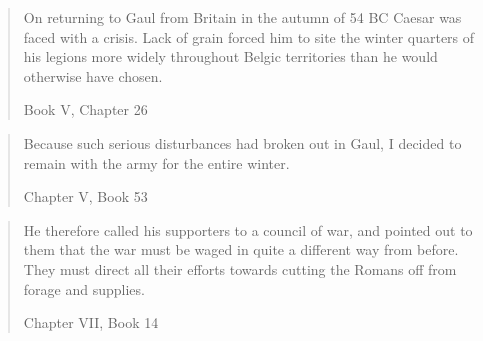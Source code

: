 \blockquote[Book V, Chapter 26]{
On returning to Gaul from Britain in the autumn of 54 BC Caesar was faced with a crisis. Lack of grain forced him to site the winter quarters of his legions more widely throughout Belgic territories than he would otherwise have chosen.}

\blockquote[Chapter V, Book 53]{Because such serious disturbances had broken out in Gaul, I decided to remain with the army for the entire winter.}

\blockquote[Chapter VII, Book 14]{He therefore called his supporters to a council of war, and pointed out to them that the war must be waged in quite a different way from before. They must direct all their efforts towards cutting the Romans off from forage and supplies.}